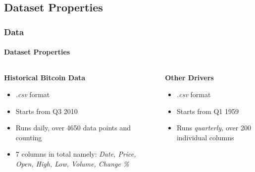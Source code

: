 \documentclass{beamer}
\begin{document}
	\subsection{Dataset Properties}	
	\begin{frame}
	\frametitle{Data}
		\framesubtitle{Dataset Properties}
		\begin{columns}
				\begin{column}{0.5\textwidth}
					\textbf{Historical Bitcoin Data}
					\begin{itemize}
						\item \emph{.csv} format
						\item Starts from Q3 2010
						\item Runs daily, over 4650 data points and counting
						\item 7 columns in total namely: \emph{Date, Price, Open, High, Low, Volume, Change \%}
					\end{itemize}
				\end{column}
				\begin{column}{0.5\textwidth}
					\textbf{Other Drivers}
				\begin{itemize}
					\item \emph{.csv} format
					\item Starts from Q1 1959
					\item Runs \emph{quarterly,} over 200 individual columns
				\end{itemize}
				\end{column}
		\end{columns}
	\end{frame}
\end{document}
